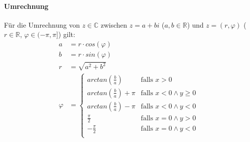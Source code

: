 			\paragraph{Umrechnung}
				Für die Umrechnung von $ z \in \mathbb{C} $ zwischen $ z = a + bi $ ($ a, b \in \mathbb{R} $) und $ z = (r, \varphi) $ ($ r \in \mathbb{R} $, $ \varphi \in (-\pi, \pi] $) gilt:
				\begin{align*}
					a       & = r \cdot cos(\varphi) \\
					b       & = r \cdot sin(\varphi) \\
					r       & = \sqrt{a ^ 2 + b ^ 2} \\
					\varphi & =
					\begin{cases}
						arctan(\frac{b}{a})       & \text{falls } x > 0                \\
						arctan(\frac{b}{a}) + \pi & \text{falls } x < 0 \land y \geq 0 \\
						arctan(\frac{b}{a}) - \pi & \text{falls } x < 0 \land y < 0    \\
						\frac{\pi}{2}             & \text{falls } x = 0 \land y > 0    \\
						-\frac{\pi}{2}            & \text{falls } x = 0 \land y < 0    \\
					\end{cases}
				\end{align*}
